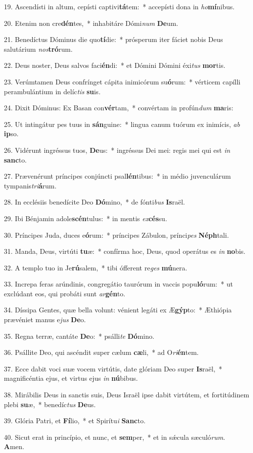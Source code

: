 19. Ascendísti in altum, cepísti captivi\textbf{tá}tem:~*  accepísti dona in \textit{ho}\textbf{mí}nibus.\

20. Etenim non cre\textbf{dén}tes,~*  inhabitáre Dómi\textit{num} \textbf{De}um.\

21. Benedíctus Dóminus die quo\textbf{tí}die:~*  prósperum iter fáciet nobis Deus salutárium \textit{nos}\textbf{tró}rum.\

22. Deus noster, Deus salvos faci\textbf{én}di:~*  et Dómini Dómini éxi\textit{tus} \textbf{mor}tis.\

23. Verúmtamen Deus confrínget cápita inimicórum su\textbf{ó}rum:~*  vérticem capílli perambulántium in delíc\textit{tis} \textbf{su}is.\

24. Dixit Dóminus: Ex Basan con\textbf{vér}tam,~*  convértam in profún\textit{dum} \textbf{ma}ris:\

25. Ut intingátur pes tuus in \textbf{sán}guine:~*  lingua canum tuórum ex inimícis, \textit{ab} \textbf{ip}so.\

26. Vidérunt ingréssus tuos, \textbf{De}us:~*  ingréssus Dei mei: regis mei qui est \textit{in} \textbf{sanc}to.\

27. Prævenérunt príncipes conjúncti psal\textbf{lén}tibus:~*  in médio juvenculárum tympanis\textit{tri}\textbf{á}rum.\

28. In ecclésiis benedícite Deo \textbf{Dó}mino,~*  de fónti\textit{bus} \textbf{Is}raël.\

29. Ibi Bénjamin adole\textbf{scén}tulus:~*  in mentis \textit{ex}\textbf{cés}su.\

30. Príncipes Juda, duces e\textbf{ó}rum:~*  príncipes Zábulon, prínci\textit{pes} \textbf{Néph}tali.\

31. Manda, Deus, virtúti \textbf{tu}æ:~*  confírma hoc, Deus, quod operátus es \textit{in} \textbf{no}bis.\

32. A templo tuo in Je\textbf{rú}salem,~*  tibi ófferent re\textit{ges} \textbf{mú}nera.\

33. Increpa feras arúndinis, congregátio taurórum in vaccis popu\textbf{ló}rum:~*  ut exclúdant eos, qui probáti sunt \textit{ar}\textbf{gén}to.\

34. Díssipa Gentes, quæ bella volunt: vénient legáti ex Æ\textbf{gýp}to:~*  Æthiópia prævéniet manus e\textit{jus} \textbf{De}o.\

35. Regna terræ, cantáte \textbf{De}o:~*  psálli\textit{te} \textbf{Dó}mino.\

36. Psállite Deo, qui ascéndit super cælum \textbf{cæ}li,~*  ad O\textit{ri}\textbf{én}tem.\

37. Ecce dabit voci suæ vocem virtútis, date glóriam Deo super \textbf{Is}raël,~*  magnificéntia ejus, et virtus ejus \textit{in} \textbf{nú}bibus.\

38. Mirábilis Deus in sanctis suis, Deus Israël ipse dabit virtútem, et fortitúdinem plebi \textbf{su}æ,~*  benedíc\textit{tus} \textbf{De}us.\

39. Glória Patri, et \textbf{Fí}lio,~*  et Spirítu\textit{i} \textbf{Sanc}to.\

40. Sicut erat in princípio, et nunc, et \textbf{sem}per,~*  et in sǽcula sæculó\textit{rum}. \textbf{A}men.\

